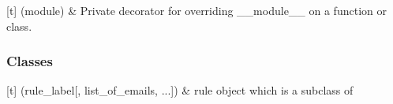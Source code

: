 \documentclass[letterpaper,10pt,english]{sphinxmanual}
\begin{document}
\begin{savenotes}\sphinxattablestart
\sphinxthistablewithglobalstyle
\sphinxthistablewithnovlinesstyle
\centering
\begin{tabulary}{\linewidth}[t]{}
\sphinxtoprule
\sphinxtableatstartofbodyhook
\sphinxAtStartPar
{}(module)
&
\sphinxAtStartPar
Private decorator for overriding \_\_module\_\_ on a function or class.
\\
\sphinxbottomrule
\end{tabulary}
\sphinxtableafterendhook\par
\sphinxattableend\end{savenotes}
\subsubsection*{Classes}


\begin{savenotes}\sphinxattablestart
\sphinxthistablewithglobalstyle
\sphinxthistablewithnovlinesstyle
\centering
\begin{tabulary}{\linewidth}[t]{}
\sphinxtoprule
\sphinxtableatstartofbodyhook
\sphinxAtStartPar
{\hyperref[\detokenize{_autosummary/gmail_rules.rules.move_to:gmail_rules.rules.move_to.Move_To}]{}}(rule\_label{[}, list\_of\_emails, ...{]})
&
\sphinxAtStartPar
{\hyperref[\detokenize{_autosummary/gmail_rules.rules.move_to:gmail_rules.rules.move_to.Move_To}]{}} rule object which is a sub\sphinxhyphen{}class of 
\\
\sphinxbottomrule
\end{tabulary}
\sphinxtableafterendhook\par
\sphinxattableend\end{savenotes}
\end{document}
